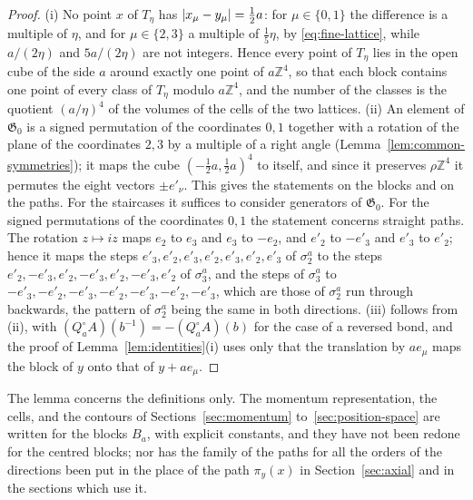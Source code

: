 \documentclass[11pt]{preprint}
\DeclarePairedDelimiter{\abs}{\lvert}{\rvert}
\numberwithin{equation}{section}
\theoremstyle{definition}
\theoremstyle{remark}
\theoremstyle{plain}
\begin{document}
\begin{proof}
(i) No point $x$ of $T_\eta$ has $\abs{x_\mu - y_\mu} = \frac12a$: for $\mu \in \{ 0, 1 \}$ the difference is a multiple of $\eta$, and for $\mu \in \{ 2, 3 \}$ a multiple of $\frac15\eta$, by \eqref{eq:fine-lattice}, while $a/(2\eta)$ and $5a/(2\eta)$ are not integers. Hence every point of $T_\eta$ lies in the open cube of the side $a$ around exactly one point of $a\mathbb Z^4$, so that each block contains one point of every class of $T_\eta$ modulo $a\mathbb Z^4$, and the number of the classes is the quotient $(a/\eta)^4$ of the volumes of the cells of the two lattices. (ii) An element of $\mathfrak G_0$ is a signed permutation of the coordinates $0, 1$ together with a rotation of the plane of the coordinates $2, 3$ by a multiple of a right angle (Lemma~\ref{lem:common-symmetries}); it maps the cube $(-\frac12a, \frac12a)^4$ to itself, and since it preserves $\rho\mathbb Z^4$ it permutes the eight vectors $\pm e'_\nu$. This gives the statements on the blocks and on the paths. For the staircases it suffices to consider generators of $\mathfrak G_0$. For the signed permutations of the coordinates $0, 1$ the statement concerns straight paths. The rotation $z \mapsto iz$ maps $e_2$ to $e_3$ and $e_3$ to $-e_2$, and $e'_2$ to $-e'_3$ and $e'_3$ to $e'_2$; hence it maps the steps $e'_3, e'_2, e'_3, e'_2, e'_3, e'_2, e'_3$ of $\sigma^a_2$ to the steps $e'_2, -e'_3, e'_2, -e'_3, e'_2, -e'_3, e'_2$ of $\sigma^a_3$, and the steps of $\sigma^a_3$ to $-e'_3, -e'_2, -e'_3, -e'_2, -e'_3, -e'_2, -e'_3$, which are those of $\sigma^a_2$ run through backwards, the pattern of $\sigma^a_2$ being the same in both directions. (iii) follows from (ii), with $(Q^\circ_aA)(b^{-1}) = -(Q^\circ_aA)(b)$ for the case of a reversed bond, and the proof of Lemma~\ref{lem:identities}(i) uses only that the translation by $ae_\mu$ maps the block of $y$ onto that of $y + ae_\mu$.
\end{proof}

The lemma concerns the definitions only. The momentum representation, the cells, and the contours of Sections~\ref{sec:momentum} to~\ref{sec:position-space} are written for the blocks $B_a$, with explicit constants, and they have not been redone for the centred blocks; nor has the family of the paths for all the orders of the directions been put in the place of the path $\pi_y(x)$ in Section~\ref{sec:axial} and in the sections which use it.
\end{document}
